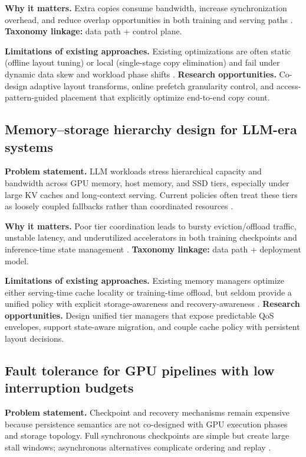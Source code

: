 \textbf{Why it matters.} Extra copies consume bandwidth, increase synchronization overhead, and reduce overlap opportunities in both training and serving paths \cite{murray2021tfdata,kwon2023vllm}. \textbf{Taxonomy linkage:} data path + control plane.

\textbf{Limitations of existing approaches.} Existing optimizations are often static (offline layout tuning) or local (single-stage copy elimination) and fail under dynamic data skew and workload phase shifts \cite{hoard2018,geminifs2025}. \textbf{Research opportunities.} Co-design adaptive layout transforms, online prefetch granularity control, and access-pattern-guided placement that explicitly optimize end-to-end copy count.

\subsection{Memory--storage hierarchy design for LLM-era systems}

\textbf{Problem statement.} LLM workloads stress hierarchical capacity and bandwidth across GPU memory, host memory, and SSD tiers, especially under large KV caches and long-context serving. Current policies often treat these tiers as loosely coupled fallbacks rather than coordinated resources \cite{kwon2023vllm,zhong2024distserve,rajbhandari2021zeroinfinity}.

\textbf{Why it matters.} Poor tier coordination leads to bursty eviction/offload traffic, unstable latency, and underutilized accelerators in both training checkpoints and inference-time state management \cite{rajbhandari2021zeroinfinity,nvidia_gdrdma}. \textbf{Taxonomy linkage:} data path + deployment model.

\textbf{Limitations of existing approaches.} Existing memory managers optimize either serving-time cache locality or training-time offload, but seldom provide a unified policy with explicit storage-awareness and recovery-awareness \cite{kwon2023vllm,geminifs2025}. \textbf{Research opportunities.} Design unified tier managers that expose predictable QoS envelopes, support state-aware migration, and couple cache policy with persistent layout decisions.

\subsection{Fault tolerance for GPU pipelines with low interruption budgets}

\textbf{Problem statement.} Checkpoint and recovery mechanisms remain expensive because persistence semantics are not co-designed with GPU execution phases and storage topology. Full synchronous checkpoints are simple but create large stall windows; asynchronous alternatives complicate ordering and replay \cite{hdf5gds2020,rajbhandari2021zeroinfinity}.

